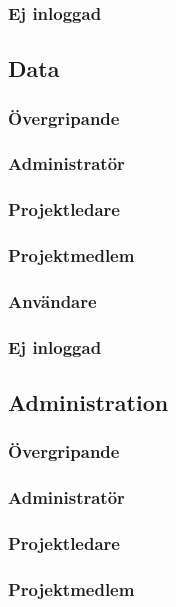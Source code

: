 \documentclass[a4paper]{article}
\begin{document}
		\subsubsection*{Ej inloggad}
		
	\subsection{Data}
		\label{krav-funk-data}
		\subsubsection*{Övergripande}
		\subsubsection*{Administratör}
		\subsubsection*{Projektledare}
		\subsubsection*{Projektmedlem}
		\subsubsection*{Användare}
		\subsubsection*{Ej inloggad}
		
	\subsection{Administration}
		\label{krav-funk-admin}
		\subsubsection*{Övergripande}
		\subsubsection*{Administratör}
		\subsubsection*{Projektledare}
		\subsubsection*{Projektmedlem}
\end{document}

